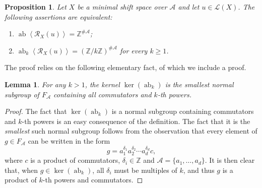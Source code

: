 \documentclass{amsart}
\newcommand*{\zz}{\mathbb{Z}}
\newcommand*{\ret}{\mathcal{R}}
\newcommand*{\lang}{\mathcal{L}}
\newcommand*{\cA}{\mathcal{A}}
\newcommand*{\ab}{\operatorname{ab}}
\newcommand*{\card}{\#}
\newcommand*{\gen}[1]{\left\langle #1\right\rangle}
\theoremstyle{plain}
\newtheorem{proposition}[theorem]{Proposition}
\newtheorem{lemma}[theorem]{Lemma}
\theoremstyle{definition}
\theoremstyle{remark}
\begin{document}
\begin{proposition}\label{P:local-global-abelian}
    Let $X$ be a minimal shift space over $\cA$ and let $u\in\lang(X)$. The following assertions are equivalent:
    \begin{enumerate}
        \item $\ab\gen{\ret_X(u)} = \zz^{\card\cA}$;\label{i:global-abelian}
        \item $\ab_k\gen{\ret_X(u)} = (\zz/k\zz)^{\card\cA}$ for every $k\geq 1$.\label{i:local-abelian}
    \end{enumerate}
\end{proposition}

The proof relies on the following elementary fact, of which we include a proof.
\begin{lemma}\label{l:kernel-ab-k}
    For any $k>1$, the kernel $\ker(\ab_k)$ is the smallest normal subgroup of $F_\cA$ containing all commutators and $k$-th powers.
\end{lemma}

\begin{proof}
    The fact that $\ker(\ab_k)$ is a normal subgroup containing commutators and $k$-th powers is an easy consequence of the definition. The fact that it is the \emph{smallest} such normal subgroup follows from the observation that every element of $g\in F_\cA$ can be written in the form
    \begin{equation*}
        g = a_1^{\delta_1}a_2^{\delta_2}\cdots a_d^{\delta_d}c,
    \end{equation*}
    where $c$ is a product of commutators, $\delta_i\in\zz$ and $\cA = \{a_1,\dots,a_d\}$. It is then clear that, when $g\in\ker(\ab_k)$, all $\delta_i$ must be multiples of $k$, and thus $g$ is a product of $k$-th powers and commutators.
\end{proof}
\end{document}
